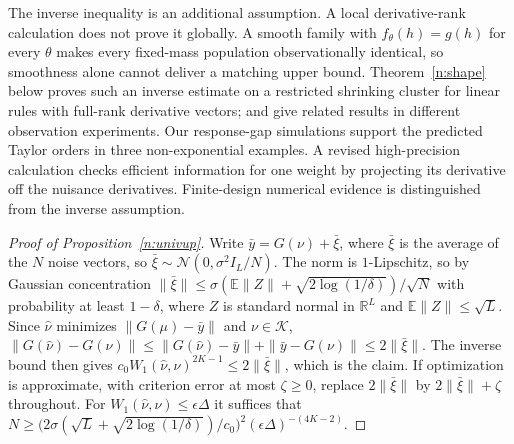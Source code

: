 \documentclass[12pt]{article}
\theoremstyle{definition}
\theoremstyle{remark}
\begin{document}
The inverse inequality is an additional assumption. A local derivative-rank calculation does not prove it globally. A smooth family with $f_\theta(h)=g(h)$ for every $\theta$ makes every fixed-mass population observationally identical, so smoothness alone cannot deliver a matching upper bound. Theorem~\ref{n:shape} below proves such an inverse estimate on a restricted shrinking cluster for linear rules with full-rank derivative vectors; \citet{heinrich2018} and \citet{batenkov2021} give related results in different observation experiments. Our response-gap simulations support the predicted Taylor orders in three non-exponential examples. A revised high-precision calculation checks efficient information for one weight by projecting its derivative off the nuisance derivatives. Finite-design numerical evidence is distinguished from the inverse assumption.



\begin{proof}[Proof of Proposition~\ref{n:univup}]
Write $\bar y=G(\nu)+\bar\xi$, where $\bar\xi$ is the average of the $N$ noise vectors, so $\bar\xi\sim\mathcal N(0,\sigma^2I_L/N)$. The norm is $1$-Lipschitz, so by Gaussian concentration $\|\bar\xi\|\le\sigma(\mathbb E\|Z\|+\sqrt{2\log(1/\delta)})/\sqrt N$ with probability at least $1-\delta$, where $Z$ is standard normal in $\mathbb R^L$ and $\mathbb E\|Z\|\le\sqrt L$. Since $\hat\nu$ minimizes $\|G(\mu)-\bar y\|$ and $\nu\in\mathcal K$, $\|G(\hat\nu)-G(\nu)\|\le\|G(\hat\nu)-\bar y\|+\|\bar y-G(\nu)\|\le2\|\bar\xi\|$. The inverse bound then gives $c_0W_1(\hat\nu,\nu)^{2K-1}\le2\|\bar\xi\|$, which is the claim. If optimization is approximate, with criterion error at most $\zeta\ge0$, replace $2\|\bar\xi\|$ by $2\|\bar\xi\|+\zeta$ throughout. For $W_1(\hat\nu,\nu)\le\epsilon\Delta$ it suffices that $N\ge\big(2\sigma(\sqrt L+\sqrt{2\log(1/\delta)})/c_0\big)^2(\epsilon\Delta)^{-(4K-2)}$.
\end{proof}
\end{document}
